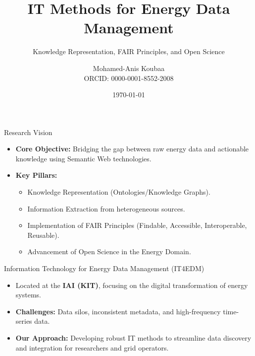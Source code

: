 \documentclass{beamer}
\title[Research Interests]{IT Methods for Energy Data Management}
\subtitle{Knowledge Representation, FAIR Principles, and Open Science}
\author[Mohamed-Anis Koubaa]{Mohamed-Anis Koubaa \\ \small ORCID: 0000-0001-8552-2008}
\institute[KIT]{Karlsruhe Institute of Technology (KIT) \\ Institute for Applied Informatics (IAI) -- IT4EDM}
\date{\today}
\begin{document}
\begin{frame}
    \titlepage
\end{frame}

\begin{frame}{Research Vision}
    \begin{itemize}
        \item \textbf{Core Objective:} Bridging the gap between raw energy data and actionable knowledge using Semantic Web technologies.
        \item \textbf{Key Pillars:}
            \begin{itemize}
                \item Knowledge Representation (Ontologies/Knowledge Graphs).
                \item Information Extraction from heterogeneous sources.
                \item Implementation of FAIR Principles (Findable, Accessible, Interoperable, Reusable).
                \item Advancement of Open Science in the Energy Domain.
            \end{itemize}
    \end{itemize}
\end{frame}

\begin{frame}{Information Technology for Energy Data Management (IT4EDM)}
    \begin{itemize}
        \item Located at the \textbf{IAI (KIT)}, focusing on the digital transformation of energy systems.
        \item \textbf{Challenges:} Data silos, inconsistent metadata, and high-frequency time-series data.
        \item \textbf{Our Approach:} Developing robust IT methods to streamline data discovery and integration for researchers and grid operators.
    \end{itemize}
\end{frame}
\end{document}
